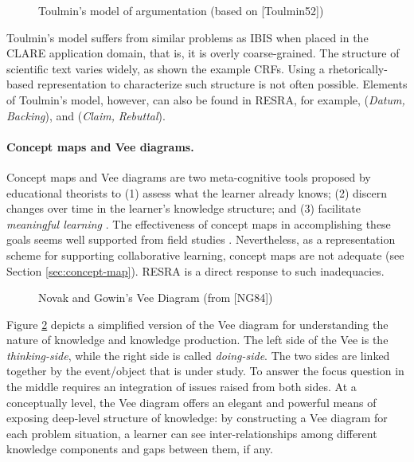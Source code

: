 \begin{figure}[htbp]
 \caption{Toulmin's model of argumentation (based on [Toulmin52])}
  \label{fig:toulmin}
\end{figure}

Toulmin's model suffers from similar problems as IBIS when placed in the
CLARE application domain, that is, it is overly coarse-grained. The
structure of scientific text varies widely, as shown the example
CRFs. Using a rhetorically-based representation to characterize such
structure is not often possible. Elements of Toulmin's model, however, can
also be found in RESRA, for example,  ({\it Datum,\/}
{\it Backing\/}), and  ({\it Claim,\/} {\it Rebuttal\/}).


\paragraph{Concept maps and Vee diagrams.}

Concept maps and Vee diagrams are two meta-cognitive tools proposed by
educational theorists to (1) assess what the learner already knows; (2)
discern changes over time in the learner's knowledge structure; and (3)
facilitate {\it meaningful learning\/} \cite{Novak84}. The effectiveness of
concept maps in accomplishing these goals seems well supported from field
studies \cite{Cliburn90,Novak90,Roth92,Arnaudin84}.  Nevertheless, as a
representation scheme for supporting collaborative learning, concept maps
are not adequate (see Section \ref{sec:concept-map}).  RESRA is a direct
response to such inadequacies.

\begin{figure}[htbp]
 \caption{Novak and Gowin's Vee Diagram (from [NG84])}
  \label{fig:vee}
\end{figure}

Figure \ref{fig:vee} depicts a simplified version of the Vee diagram for
understanding the nature of knowledge and knowledge production. The left
side of the Vee is the {\it thinking-side\/}, while the right side is
called {\it doing-side\/}. The two sides are linked together by the
event/object that is under study. To answer the focus question in the
middle requires an integration of issues raised from both sides. At a
conceptually level, the Vee diagram offers an elegant and powerful means of
exposing deep-level structure of knowledge: by constructing a Vee diagram
for each problem situation, a learner can see inter-relationships among
different knowledge components and gaps between them, if any.


